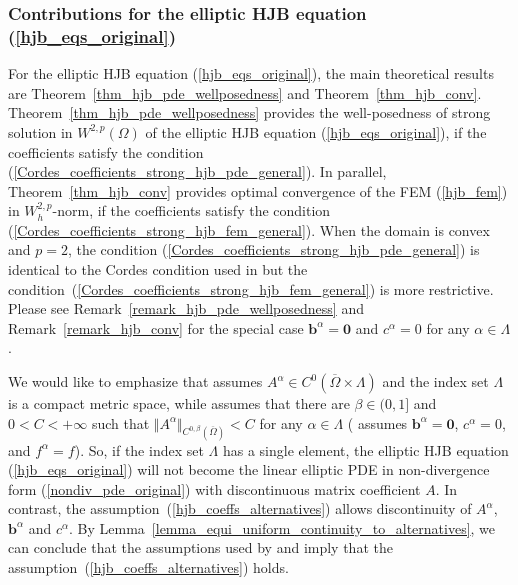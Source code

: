 \documentclass[12pt]{amsart}
\theoremstyle{definition}
\theoremstyle{remark}
\begin{document}
\subsubsection{Contributions for the elliptic HJB equation (\ref{hjb_eqs_original})}

For the elliptic HJB equation (\ref{hjb_eqs_original}), the main theoretical results are 
Theorem~\ref{thm_hjb_pde_wellposedness} and Theorem~\ref{thm_hjb_conv}.  
Theorem~\ref{thm_hjb_pde_wellposedness} provides the well-posedness of 
strong solution in $W^{2,p}(\Omega)$ of the elliptic HJB equation (\ref{hjb_eqs_original}),  
if the coefficients satisfy the condition (\ref{Cordes_coefficients_strong_hjb_pde_general}). 
In parallel, Theorem~\ref{thm_hjb_conv} provides optimal convergence of the FEM (\ref{hjb_fem}) 
in $W_{h}^{2,p}$-norm, if the coefficients satisfy the condition 
(\ref{Cordes_coefficients_strong_hjb_fem_general}). 
When the domain is convex and $p=2$, the condition (\ref{Cordes_coefficients_strong_hjb_pde_general}) 
is identical to the Cordes condition used in \cite{SmearsSuli2014} but 
the condition~(\ref{Cordes_coefficients_strong_hjb_fem_general}) is more restrictive.
Please see Remark~\ref{remark_hjb_pde_wellposedness} and Remark~\ref{remark_hjb_conv} for the special 
case $\boldsymbol{b}^{\alpha}=\boldsymbol{0}$ and $c^{\alpha} = 0$ for any $\alpha \in \Lambda$. 

We would like to emphasize that \cite{SmearsSuli2014} assumes $A^{\alpha} \in C^{0}(\overline{\Omega}\times 
\Lambda)$ and the index set $\Lambda$ is a compact metric space, while \cite[Proposition~$4.3$]{GallistlTran2025} 
assumes that there are $\beta \in (0,1]$ and $0< C < + \infty$ such that 
$\Vert A^{\alpha}\Vert_{C^{0,\beta}(\overline{\Omega})}  < C$  for any $\alpha \in \Lambda$ 
(\cite[Proposition~$4.3$]{GallistlTran2025} assumes $\boldsymbol{b}^{\alpha}=\boldsymbol{0}$, $c^{\alpha} = 0$, 
and $f^{\alpha}=f$). 
So, if the index set $\Lambda$ has a single element, the elliptic HJB equation (\ref{hjb_eqs_original}) 
will not become the linear elliptic PDE in non-divergence form (\ref{nondiv_pde_original}) with 
discontinuous matrix coefficient $A$. In contrast, the assumption~(\ref{hjb_coeffs_alternatives}) allows 
discontinuity of $A^{\alpha}$, $\boldsymbol{b}^{\alpha}$ and $c^{\alpha}$. By 
Lemma~\ref{lemma_equi_uniform_continuity_to_alternatives}, we can conclude that the assumptions used by 
\cite{SmearsSuli2014} and \cite[Proposition~$4.3$]{GallistlTran2025} imply that the 
assumption~(\ref{hjb_coeffs_alternatives}) holds.
\end{document}
